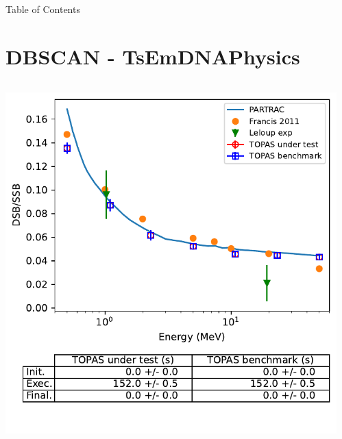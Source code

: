 \documentclass[aspectratio=1610]{beamer}
\title{\SUTname}
\subtitle{Regression testing (cf.\ \benchmarkname)}
\author{Jos\'e Ramos-M\'endez and Thongchai A.M. Masilela}
\institute{University of California San Francisco}
\date{\today}
\begin{document}
\frame{\titlepage}


\begin{frame}[allowframebreaks]{Table of Contents}
  \tableofcontents[sections={1-11}]
    \framebreak
  \tableofcontents[sections={12-}]
\end{frame}

\section{DBSCAN - TsEmDNAPhysics}

\begin{frame}{\secname}
 \begin{columns}
  \begin{column}{0.4\linewidth}
   \includegraphics[width=1.1\textwidth]{./DBSCAN/DBSCAN2_TsEmDNAPhysics}
  \end{column}
  \begin{column}{0.6\linewidth} 

\end{column}
\end{columns}
\end{frame}
\end{document}
